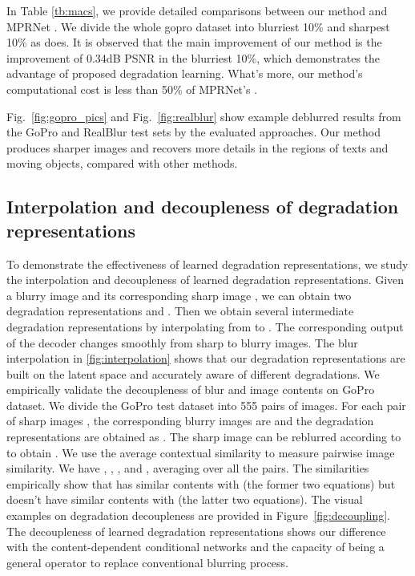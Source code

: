 \documentclass[runningheads]{llncs}
\begin{document}
In Table \ref{tb:macs}, we provide detailed comparisons between our method and MPRNet \cite{Zamir2021MPRNet}. 
We divide the whole gopro dataset into blurriest 10\% and sharpest 10\% as \cite{Son2021PVDNet} does. It is observed that the main improvement of our method is the improvement of 0.34dB PSNR in the blurriest 10\%, which demonstrates the advantage of proposed degradation learning. What's more, our method's computational cost is less than 50\% of MPRNet's \cite{Zamir2021MPRNet}.

Fig.~\ref{fig:gopro_pics} and Fig.~\ref{fig:realblur} show example deblurred results from the GoPro \cite{deblur-multi-scale} and RealBlur \cite{realblur} test sets by the evaluated approaches.
Our method produces sharper images and recovers more details in the regions of texts and moving objects, compared with other methods.

\subsection{Interpolation and decoupleness of degradation representations}

To demonstrate the effectiveness of learned degradation representations, we study the interpolation and decoupleness of learned degradation representations. 
Given a blurry image  and its corresponding sharp image , we can obtain two degradation representations  and .  Then we obtain several intermediate degradation representations by interpolating from  to . The corresponding output of the decoder changes smoothly from sharp to blurry images. 
The blur interpolation in \cref{fig:interpolation} shows that our degradation representations are built on the latent space and accurately aware of different degradations.
We empirically validate the decoupleness of blur and image contents on GoPro dataset. We divide the GoPro test dataset into 555 pairs of images. For each pair of sharp images , the corresponding blurry images are  and the degradation representations are obtained as . The sharp image  can be reblurred according to  to obtain . 
We use the average contextual similarity  \cite{contextual} to measure pairwise image similarity. We have , , , and , averaging over all the pairs. The similarities empirically show that   has similar contents with  (the former two equations) but doesn't have similar contents with  (the latter two equations). The visual examples on degradation decoupleness are provided in Figure~\ref{fig:decoupling}. The decoupleness of learned degradation representations shows our difference with the content-dependent conditional networks \cite{wang2018sftgan,spatially_variant_recurrent,zhou2019stfan} and the capacity of being a general operator to replace conventional blurring process.
\end{document}
